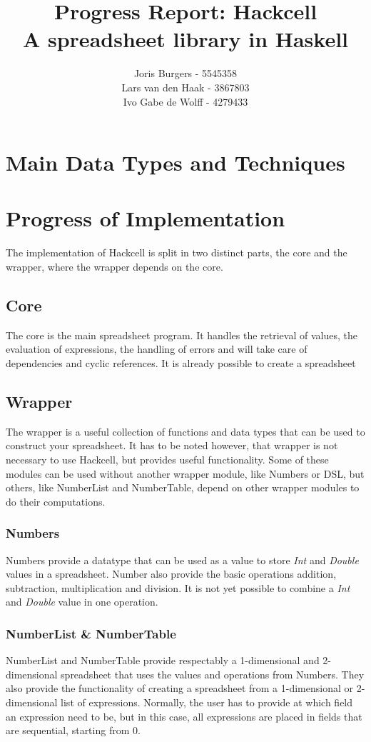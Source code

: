 \documentclass{article}
\title{
	Progress Report: Hackcell \\
	\vskip 0.5cm
	\large{A spreadsheet library in Haskell}
}
\author{Joris Burgers - 5545358\\ Lars van den Haak - 3867803\\ Ivo Gabe de Wolff - 4279433}
\begin{document}
	\maketitle
	\section{Main Data Types and Techniques}
	
	\section{Progress of Implementation}
	The implementation of Hackcell is split in two distinct parts, the core and the wrapper, where the wrapper depends on the core.
	\subsection{Core}
	The core is the main spreadsheet program. It handles the retrieval of values, the evaluation of expressions, the handling of errors and will take care of dependencies and cyclic references. It is already possible to create a spreadsheet
	\subsection{Wrapper}
	The wrapper is a useful collection of functions and data types that can be used to construct your spreadsheet. It has to be noted however, that wrapper is not necessary to use Hackcell, but provides useful functionality. Some of these modules can be used without another wrapper module, like Numbers or DSL, but others, like NumberList and NumberTable, depend on other wrapper modules to do their computations.
	\subsubsection{Numbers}
	Numbers provide a datatype that can be used as a value to store \textit{Int} and \textit{Double} values in a spreadsheet. Number also provide the basic operations addition, subtraction, multiplication and division. It is not yet possible to combine a \textit{Int} and \textit{Double} value in one operation.
	\subsubsection{NumberList \& NumberTable}	
	NumberList and NumberTable provide respectably a 1-dimensional and 2-dimensional spreadsheet that uses the values and operations from Numbers. They also provide the functionality of creating a spreadsheet from a 1-dimensional or 2-dimensional list of expressions. Normally, the user has to provide at which field an expression need to be, but in this case, all expressions are placed in fields that are sequential, starting from 0.
\end{document}
